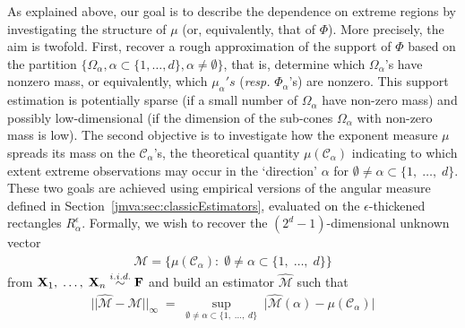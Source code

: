 As explained above, our goal is to  describe the dependence on extreme
regions by investigating the structure of $\mu$ (or, equivalently,
that of $\Phi$). %
More precisely, the aim is twofold. First, recover a rough
approximation of the support of $\Phi$ based on the partition
$\{\Omega_\alpha, \alpha\subset\{1,\ldots,d\}, \alpha\neq
\emptyset\}$, that is, determine which $\Omega_\alpha$'s have
nonzero mass, or equivalently, which $\mu_\alpha's$ (\emph{resp.}
$\Phi_\alpha$'s) are nonzero. This support estimation is potentially
sparse (if a small number of $\Omega_\alpha$ have non-zero mass) and
possibly low-dimensional (if the dimension of the sub-cones
$\Omega_\alpha$ with non-zero mass is low).
The second objective is to 
investigate how the exponent measure $\mu$ spreads its mass on the
$\mathcal{C}_{\alpha}$'s, the theoretical quantity
$\mu(\mathcal{C}_{\alpha})$ indicating to which extent extreme
observations may occur in the `direction' $\alpha$ for $\emptyset
\neq \alpha \subset \{1,\; \ldots,\; d \}$. 
These two goals are achieved using empirical versions of
the angular measure defined in
Section~\ref{jmva:sec:classicEstimators}, evaluated on the
$\epsilon$-thickened rectangles $R_\alpha^\epsilon$.
Formally, we wish to recover the $(2^{d}-1)$-dimensional unknown
vector 
\begin{align}
\label{jmva:eq:representation_M}
\mathcal{M}=\{ \mu(\mathcal{C}_{\alpha}):\; \emptyset \neq \alpha\subset\{1,\; \ldots,\; d \}\}
\end{align}
 from $\mathbf X_1,\;
\ldots,\; \mathbf X_n\overset{i.i.d.}{\sim} \mathbf F$ and build an estimator
$\widehat{\mathcal{M}}$ such that
\begin{align}
\nonumber
\vert\vert \widehat{\mathcal{M}} -\mathcal{M}
\vert\vert_{\infty} \;%
{=} \; \sup_{\emptyset \neq \alpha \subset \{1,\; \ldots,\; d \}}\; \vert
\widehat{\mathcal{M}}(\alpha)- \mu(\mathcal{C}_{\alpha})\vert
\end{align}
